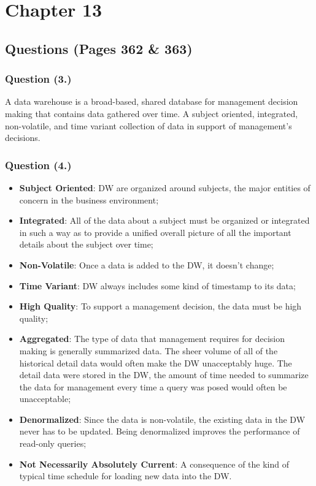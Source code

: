 \chapter{Chapter 13}
	\section{Questions (Pages 362 \& 363)}
		\subsection{Question (3.)}
			A data warehouse is a broad-based, shared database for management decision making that contains data gathered over time. A subject oriented, integrated, non-volatile, and time variant collection of data in support of management's decisions.
		\subsection{Question (4.)}
			\begin{itemize}
				\item{\textbf{Subject Oriented}: DW are organized around subjects, the major entities of concern in the business environment;}
				\item{\textbf{Integrated}: All of the data about a subject must be organized or integrated in such a way as to provide a unified overall picture of all the important details about the subject over time;}
				\item{\textbf{Non-Volatile}: Once a data is added to the DW, it doesn't change;}
				\item{\textbf{Time Variant}: DW always includes some kind of timestamp to its data;}
				\item{\textbf{High Quality}: To support a management decision, the data must be high quality;}
				\item{\textbf{Aggregated}: The type of data that management requires for decision making is generally summarized data. The sheer volume of all of the historical detail data would often make the DW unacceptably huge. The detail data were stored in the DW, the amount of time needed to summarize the data for management every time a query was posed would often be unacceptable;}
				\item{\textbf{Denormalized}: Since the data is non-volatile, the existing data in the DW never has to be updated. Being denormalized improves the performance of read-only queries;}
				\item{\textbf{Not Necessarily Absolutely Current}: A consequence of the kind of typical time schedule for loading new data into the DW.}
			\end{itemize}
